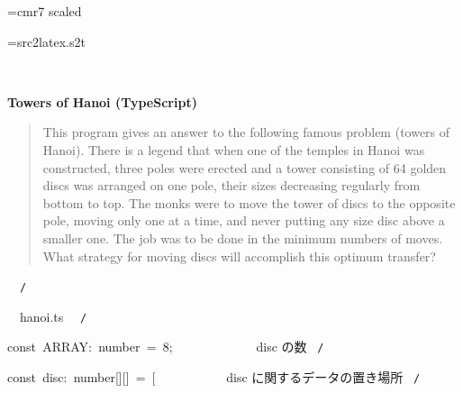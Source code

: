 \documentclass{article}
\begin{document}
\ifx\sevenrm\undefined
  \font\sevenrm=cmr7 scaled 
\fi

\newread\MyStyle
\openin\MyStyle=src2latex.s2t
\ifeof\MyStyle
  \closein\MyStyle
\else
  
  \closein\MyStyle
\fi

\def\mc{\relax}
\def\gt{\relax}
\def\sc{\scshape}

\tt\mc 

\noindent
\rm\mc {\tt /}{\tt *}\  \hrulefill \rm\mc \ {\tt *}

\noindent
\mbox{}\hfill

\noindent
\mbox{}\hfill

\noindent
\mbox{} {}%

\centerline{\bf Towers of Hanoi (TypeScript)}

\begin{quote}

This program gives an answer to the following famous problem (towers of
Hanoi).
There is a legend that when one of the temples in Hanoi was constructed,
three poles were erected and a tower consisting of 64 golden discs was
arranged on one pole, their sizes decreasing regularly from bottom to top.
The monks were to move the tower of discs to the opposite pole, moving
only one at a time, and never putting any size disc above a smaller one.
The job was to be done in the minimum numbers of moves. What strategy for
moving discs will accomplish this optimum transfer?
\end{quote}


\noindent
\mbox{}\hfill

\noindent
\mbox{}{\tt *}\  \hrulefill \rm\mc \ {\tt *}{\tt /}
\tt\mc 

\noindent
\mbox{}\hfill

\noindent
\mbox{}\hfill

\noindent
\mbox{}\rm\mc {\tt /}{\tt *}\  \hrulefill\ hanoi.ts \ \hrulefill \rm\mc \ {\tt *}{\tt /}
\tt\mc 

\noindent
\mbox{}\hfill

\noindent
\mbox{}\hfill

\noindent
\mbox{}const{\tt\mc \ }ARRAY:{\tt\mc \ }number{\tt\mc \ }={\tt\mc \ }8;{\tt\mc \ \ \ \ \ \ \ \ \ \ \ \ }\rm\mc {\tt /}{\tt *}\  {}disc の数 \hfill \rm\mc \ {\tt *}{\tt /}
\tt\mc 

\noindent
\mbox{}\hfill

\noindent
\mbox{}const{\tt\mc \ }disc:{\tt\mc \ }number[][]{\tt\mc \ }={\tt\mc \ }[{\tt\mc \ \ \ \ \ \ \ \ \ \ }\rm\mc {\tt /}{\tt *}\  {}disc に関するデータの置き場所 \hfill \rm\mc \ {\tt *}{\tt /}
\tt\mc 
\end{document}
